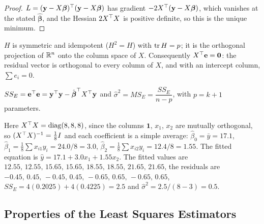 \begin{proof}
$L=(\mathbf{y}-X\boldsymbol\beta)^{\top}(\mathbf{y}-X\boldsymbol\beta)$ has gradient $-2X^{\top}(\mathbf{y}-X\boldsymbol\beta)$, which vanishes at the stated $\hat{\boldsymbol\beta}$, and the Hessian $2X^{\top} X$ is positive definite, so this is the unique minimum.
\end{proof}

\begin{theorem}\label{thm:hat}
$H$ is symmetric and idempotent ($H^2=H$) with $\operatorname{tr} H=p$; it is the orthogonal projection of $\mathbb{R}^n$ onto the column space of $X$. Consequently $X^{\top}\mathbf{e}=\mathbf{0}$: the residual vector is orthogonal to every column of $X$, and with an intercept column, $\sum e_i=0$.
\end{theorem}

\begin{definition}
$SS_E=\mathbf{e}^{\top}\mathbf{e}=\mathbf{y}^{\top}\mathbf{y}-\hat{\boldsymbol\beta}^{\top} X^{\top}\mathbf{y}$ and $\hat\sigma^2=MS_E=\dfrac{SS_E}{n-p}$, with $p=k+1$ parameters.
\end{definition}

\begin{example}\label{ex:mlrfit}
Here $X^{\top} X=\operatorname{diag}(8,8,8)$, since the columns $\mathbf{1}$, $x_1$, $x_2$ are mutually orthogonal, so $(X^{\top} X)^{-1}=\tfrac18I$ and each coefficient is a simple average: $\hat\beta_0=\bar{y}=17.1$, $\hat\beta_1=\tfrac18\sum x_{i1}y_i=24.0/8=3.0$, $\hat\beta_2=\tfrac18\sum x_{i2}y_i=12.4/8=1.55$. The fitted equation is $\hat{y}=17.1+3.0x_1+1.55x_2$. The fitted values are $12.55,\,12.55,\,15.65,\,15.65,\,18.55,\,18.55,\,21.65,\,21.65$, the residuals are $-0.45,\,0.45,\,-0.45,\,0.45,\,-0.65,\,0.65,\,-0.65,\,0.65$, $SS_E=4(0.2025)+4(0.4225)=2.5$ and $\hat\sigma^2=2.5/(8-3)=0.5$.
\end{example}

\subsection{Properties of the Least Squares Estimators}

